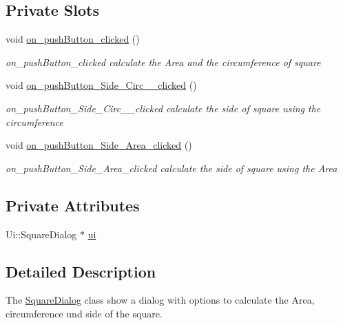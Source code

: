 \subsection*{Private Slots}
\begin{DoxyCompactItemize}
\item 
void \mbox{\hyperlink{class_square_dialog_ae51403bfd6b525bb22a857db7ef8cf89}{on\+\_\+push\+Button\+\_\+clicked}} ()
\begin{DoxyCompactList}\small\item\em on\+\_\+push\+Button\+\_\+clicked calculate the Area and the circumference of square \end{DoxyCompactList}\item 
void \mbox{\hyperlink{class_square_dialog_a8cc8d7c0933edc70f88f10e947f9e106}{on\+\_\+push\+Button\+\_\+\+Side\+\_\+\+Circ\+\_\+\+\_\+clicked}} ()
\begin{DoxyCompactList}\small\item\em on\+\_\+push\+Button\+\_\+\+Side\+\_\+\+Circ\+\_\+\+\_\+clicked calculate the side of square using the circumference \end{DoxyCompactList}\item 
void \mbox{\hyperlink{class_square_dialog_a3e51ec196b9d3b5e61bcf177999f05f5}{on\+\_\+push\+Button\+\_\+\+Side\+\_\+\+Area\+\_\+clicked}} ()
\begin{DoxyCompactList}\small\item\em on\+\_\+push\+Button\+\_\+\+Side\+\_\+\+Area\+\_\+clicked calculate the side of square using the Area \end{DoxyCompactList}\end{DoxyCompactItemize}
\subsection*{Private Attributes}
\begin{DoxyCompactItemize}
\item 
Ui\+::\+Square\+Dialog $\ast$ \mbox{\hyperlink{class_square_dialog_a2359f63a0ab0e9d7062b0ff2e60a7e96}{ui}}
\end{DoxyCompactItemize}


\subsection{Detailed Description}
The \mbox{\hyperlink{class_square_dialog}{Square\+Dialog}} class show a dialog with options to calculate the Area, circumference und side of the square. 

